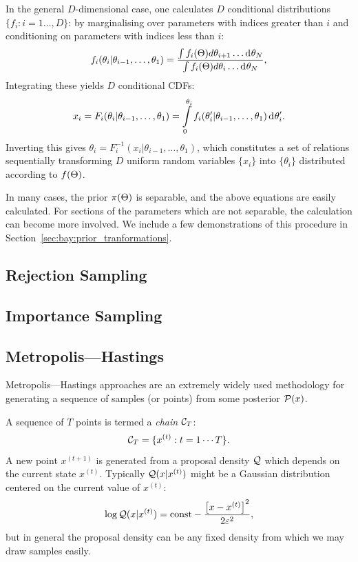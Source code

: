 In the general $D$-dimensional case, one calculates $D$ conditional distributions $\{f_i:i=1\ldots,D\}$: by marginalising over parameters with indices greater than $i$ and conditioning on parameters with indices less than $i$:
%
\begin{equation}
  f_i(\theta_i|\theta_{i-1},\ldots,\theta_1) 
  =
  \frac{%
    \int f_i(\params) d\theta_{i+1}\ldots \d{\theta_{N}}
  }{%
    \int f_i(\params) d\theta_{i}\ldots \d{\theta_{N}}
  },
\end{equation}
%
Integrating these yields $D$ conditional CDFs:
%
\begin{equation}
  x_i = F_i(\theta_i|\theta_{i-1},\ldots,\theta_1) = \int\limits_0^{\theta_i} f_i(\theta_i^\prime|\theta_{i-1},\ldots,\theta_1) \operatorname{d}^{}\!{\theta_i^\prime}.
\end{equation}
%
Inverting this gives $\theta_i = F^{-1}_i(x_i|\theta_{i-1},\ldots,\theta_1)$, which constitutes a set of relations sequentially transforming $D$ uniform random variables $\{x_i\}$ into $\{\theta_i\}$ distributed according to $f(\Theta)$.

In many cases, the prior $\pi(\Theta)$ is separable, and the above equations are easily calculated. For sections of the parameters which are not separable, the calculation can become more involved. We include a few demonstrations of this procedure in Section~\ref{sec:bay:prior_tranformations}. 



\subsection{Rejection Sampling}
\label{sec:sm:rejection}

\subsection{Importance Sampling}
\label{sec:sm:importance}

\subsection{Metropolis---Hastings}
\label{sec:sm:mh}
Metropolis---Hastings approaches are an extremely widely used methodology for generating a sequence of samples (or points) from some posterior $\mathcal{P}(x)$.

A sequence of $T$ points is termed a {\em chain\/} $\mathcal{C}_T$:
\begin{equation}
  \mathcal{C}_T = \{ x^{(t)}: t=1\cdots T \}.
\end{equation}
A new point $x^{(t+1)}$ is generated from a proposal density $\mathcal{Q}$ which depends on the current state $x^{(t)}$. Typically $\mathcal{Q}(x|x^{(t)})$ might be a Gaussian distribution centered on the current value of $x^{(t)}$:
\begin{equation}
  \log \mathcal{Q}(x|x^{(t)}) = \text{const} -\frac{{\left[ x-x^{(t)} \right]}^2}{2\varepsilon^2},
\end{equation}
but in general the proposal density can be any fixed density from which we may draw samples easily.

